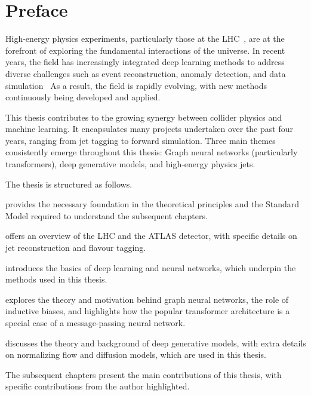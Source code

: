 \chapter{Preface}
\label{ch:intro}



High-energy physics experiments, particularly those at the \Gls{LHC}~\cite{LHCMachine}, are at the forefront of exploring the fundamental interactions of the universe.
In recent years, the field has increasingly integrated deep learning methods to address diverse challenges such as event reconstruction, anomaly detection, and data simulation~\cite{Albertsson:2018maf}
As a result, the field is rapidly evolving, with new methods continuously being developed and applied.

This thesis contributes to the growing synergy between collider physics and machine learning.
It encapsulates many projects undertaken over the past four years, ranging from jet tagging to forward simulation.
Three main themes consistently emerge throughout this thesis: Graph neural networks (particularly transformers), deep generative models, and high-energy physics jets.

The thesis is structured as follows.

 provides the necessary foundation in the theoretical principles and the Standard Model required to understand the subsequent chapters.

 offers an overview of the \Gls{LHC} and the \Gls{ATLAS} detector, with specific details on jet reconstruction and flavour tagging.

 introduces the basics of deep learning and neural networks, which underpin the methods used in this thesis.

 explores the theory and motivation behind graph neural networks, the role of inductive biases, and highlights how the popular transformer architecture is a special case of a message-passing neural network.

 discusses the theory and background of deep generative models, with extra details on normalizing flow and diffusion models, which are used in this thesis.

The subsequent chapters present the main contributions of this thesis, with specific contributions from the author highlighted.


